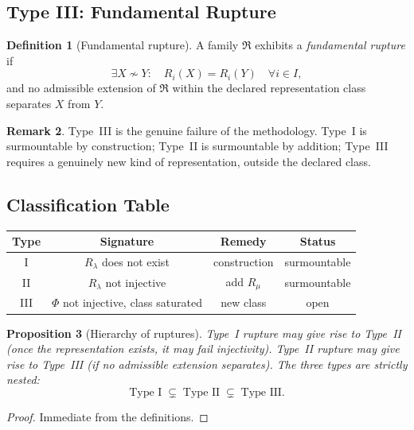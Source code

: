 \documentclass[11pt,a4paper]{article}
\theoremstyle{definition}
\newtheorem{definition}{Definition}[section]
\newtheorem{remark}[definition]{Remark}
\theoremstyle{plain}
\newtheorem{proposition}[definition]{Proposition}
\newcommand{\Rfrak}{\mathfrak{R}}
\newcommand{\Phimap}{\Phi}
\newcommand{\simadm}{\sim}
\begin{document}
\subsection{Type III: Fundamental Rupture}

\begin{definition}[Fundamental rupture]\label{def:rupture-III}
A family $\Rfrak$ exhibits a \emph{fundamental rupture} if
\[
  \exists X \not\simadm Y : \quad R_i(X) = R_i(Y) \quad \forall i \in I,
\]
and no admissible extension of $\Rfrak$ within the declared
representation class separates $X$ from $Y$.
\end{definition}

\begin{remark}
Type~III is the genuine failure of the methodology. Type~I is
surmountable by construction; Type~II is surmountable by addition;
Type~III requires a genuinely new kind of representation, outside
the declared class.
\end{remark}

\subsection{Classification Table}

\begin{center}
\begin{tabular}{c|c|c|c}
  \toprule
  Type & Signature & Remedy & Status \\
  \midrule
  I & $R_\lambda$ does not exist & construction
    & surmountable \\
  II & $R_\lambda$ not injective & add $R_\mu$
    & surmountable \\
  III & $\Phimap$ not injective, class saturated & new class
    & open \\
  \bottomrule
\end{tabular}
\end{center}

\begin{proposition}[Hierarchy of ruptures]\label{prop:hierarchy}
Type~I rupture may give rise to Type~II (once the representation
exists, it may fail injectivity). Type~II rupture may give rise to
Type~III (if no admissible extension separates). The three types
are strictly nested:
\[
  \text{Type I} \;\subsetneq\; \text{Type II} \;\subsetneq\;
  \text{Type III}.
\]
\end{proposition}

\begin{proof}
Immediate from the definitions.
\end{proof}
\end{document}
